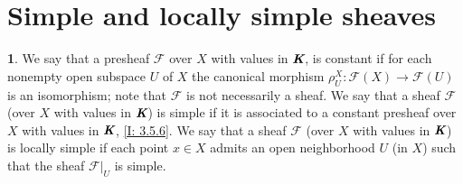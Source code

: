 \documentclass[12pt]{amsart}
\theoremstyle{definition}
\newtheorem{bk}[proposition]{}
\begin{document}
\section{Simple and locally simple sheaves}

\begin{bk}\label{I: 3.6.1} We say that a presheaf $\mathscr{F}$ over $X$ with values in $\emph{\textbf{K}}$, is constant if for each nonempty open subspace $U$ of $X$ the canonical morphism $\rho_{U}^{X}:\mathscr{F}(X)\rightarrow\mathscr{F}(U)$ is an isomorphism; note that $\mathscr{F}$ is not necessarily a sheaf. We say that a sheaf $\mathscr{F}$ (over $X$ with values in $\emph{\textbf{K}}$) is simple if it is  associated to a constant presheaf over $X$ with values in $\emph{\textbf{K}}$, \ref{I: 3.5.6}. We say that a sheaf $\mathscr{F}$ (over $X$ with values in $\emph{\textbf{K}}$) is locally simple if each point $x\in X$ admits an open neighborhood $U$ (in $X$) such that the sheaf $\mathscr{F}|_{U}$ is simple.\\
\end{bk}
\end{document}
